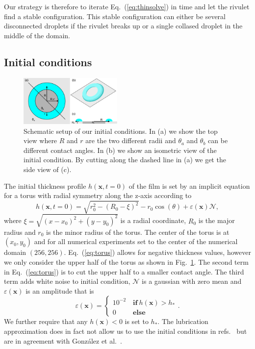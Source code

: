 \documentclass[twoside,twocolumn,9pt]{article}
\begin{document}
Our strategy is therefore to iterate Eq.~(\ref{eq:thinsolve}) in time and let the rivulet find a stable configuration.
This stable configuration can either be several disconnected droplets if the rivulet breaks up or a single collased droplet in the middle of the domain.  

\subsection{Initial conditions}
\begin{figure}
\centering
  \includegraphics[width=0.45\textwidth]{ringrivulet_shema}
  \caption{Schematic setup of our initial conditions. In (a) we show the top view where $R$ and $r$ are the two different radii and $\theta_a$ and $\theta_b$ can be different contact angles. 
  In (b) we show an isometric view of the initial condition.
  By cutting along the dashed line in (a) we get the side view of (c).}
  \label{fig:ringschema}
\end{figure}

The initial thickness profile $h(\mathbf{x}, t=0)$ of the film is set by an implicit equation for a torus with radial symmetry along the z-axis according to
\begin{equation}\label{eq:torus}
    h(\mathbf{x}, t=0) = \sqrt{r_0^2 - \left(R_0-\xi\right)^2} - r_0\cos(\theta) + \varepsilon(\mathbf{x})\mathcal{N},
\end{equation}
where $\xi = \sqrt{(x-x_0)^2+(y-y_0)^2}$ is a radial coordinate, $R_0$ is the major radius and $r_0$ is the minor radius of the torus.
The center of the torus is at $(x_0,y_0)$ and for all numerical experiments set to the center of the numerical domain $(256,256)$.
Eq.~(\ref{eq:torus}) allows for negative thickness values, however we only consider the upper half of the torus as shown in Fig.~\ref{fig:ringschema}. 
The second term in Eq.~(\ref{eq:torus}) is to cut the upper half to a smaller contact angle.
The third term adds white noise to initial condition, $\mathcal{N}$ is a gaussian with zero mean and $\varepsilon(\mathbf{x})$ is an amplitude that is 
\begin{equation}
    \varepsilon(\mathbf{x}) =
    \begin{cases}
        10^{-2}\quad \textbf{if}~h(\mathbf{x}) > h_{\ast}\\
        0~~\quad\quad \textbf{else}
    \end{cases}
    .
\end{equation} 
We further require that any $h(\mathbf{x}) < 0$ is set to $h_{\ast}$.
The lubrication approximation does in fact not allow us to use the initial conditions in refs.~\cite{nguyenCompetitionCollapseBreakup2012, wuBreakupPatternedNanoscale2010} but are in agreement with Gonz{\'a}lez et al.~\cite{gonzalezStabilityLiquidRing2013}.
\end{document}
